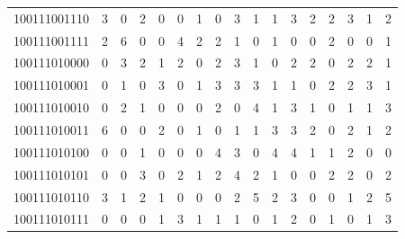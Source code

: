 \documentclass[10pt,a4paper]{article}
\begin{document}
\begin{longtable}{ |c|c|c|c|c|c|c|c|c|c|c|c|c|c|c|c|c| }
    100111001110              & 3                            & 0                                & 2                            & 0                              & 0   & 1   & 0   & 3   & 1   & 1   & 3   & 2   & 2   & 3   & 1   & 2   \\
    100111001111              & 2                            & 6                                & 0                            & 0                              & 4   & 2   & 2   & 1   & 0   & 1   & 0   & 0   & 2   & 0   & 0   & 1   \\
    100111010000              & 0                            & 3                                & 2                            & 1                              & 2   & 0   & 2   & 3   & 1   & 0   & 2   & 2   & 0   & 2   & 2   & 1   \\
    100111010001              & 0                            & 1                                & 0                            & 3                              & 0   & 1   & 3   & 3   & 3   & 1   & 1   & 0   & 2   & 2   & 3   & 1   \\
    100111010010              & 0                            & 2                                & 1                            & 0                              & 0   & 0   & 2   & 0   & 4   & 1   & 3   & 1   & 0   & 1   & 1   & 3   \\
    100111010011              & 6                            & 0                                & 0                            & 2                              & 0   & 1   & 0   & 1   & 1   & 3   & 3   & 2   & 0   & 2   & 1   & 2   \\
    100111010100              & 0                            & 0                                & 1                            & 0                              & 0   & 0   & 4   & 3   & 0   & 4   & 4   & 1   & 1   & 2   & 0   & 0   \\
    100111010101              & 0                            & 0                                & 3                            & 0                              & 2   & 1   & 2   & 4   & 2   & 1   & 0   & 0   & 2   & 2   & 0   & 2   \\
    100111010110              & 3                            & 1                                & 2                            & 1                              & 0   & 0   & 0   & 2   & 5   & 2   & 3   & 0   & 0   & 1   & 2   & 5   \\
    100111010111              & 0                            & 0                                & 0                            & 1                              & 3   & 1   & 1   & 1   & 0   & 1   & 2   & 0   & 1   & 0   & 1   & 3   \\

\end{longtable}
\end{document}
